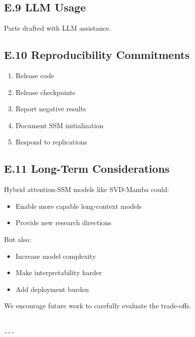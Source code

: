 \subsection{E.9 LLM Usage}

Parts drafted with LLM assistance.

\subsection{E.10 Reproducibility Commitments}

\begin{enumerate}
\item Release code
\item Release checkpoints
\item Report negative results
\item Document SSM initialization
\item Respond to replications

\end{enumerate}
\subsection{E.11 Long-Term Considerations}

Hybrid attention-SSM models like SVD-Mamba could:

\begin{itemize}
\item Enable more capable long-context models
\item Provide new research directions

\end{itemize}
But also:

\begin{itemize}
\item Increase model complexity
\item Make interpretability harder
\item Add deployment burden

\end{itemize}
We encourage future work to carefully evaluate the trade-offs.
\begin{lstlisting}

---
\end{lstlisting}